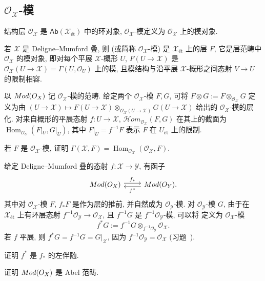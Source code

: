 \subsection{\texorpdfstring{$\mathcal O_{\mathcal X}$}{OX}-模}\label{src:5.1.2-subsection}
结构层 $\mathcal O_{\mathcal X}$ 是 $\mathsf{Ab}(\mathcal X_{\text{ét}})$ 中的环对象, $\mathcal O_{\mathcal X}$-模定义为 $\mathcal O_{\mathcal X}$ 上的模对象.
\begin{definition}\label{src:5.1.13}
若 $\mathcal X$ 是 Deligne--Mumford 叠, 则 (或简称 $\mathcal O_{\mathcal X}$-模) 是 $\mathcal X_{\text{ét}}$ 上的层 $F$, 它是层范畴中 $\mathcal O_{\mathcal X}$ 的模对象, 即对每个平展 $\mathcal X$-概形 $U$, $F(U\to\mathcal X)$ 是 $\mathcal O_{\mathcal X}(U\to\mathcal X)=\Gamma(U,\mathcal O_U)$ 上的模, 且模结构与沿平展 $\mathcal X$-概形之间态射 $V\to U$ 的限制相容.
\end{definition}
以 $Mod(O_{X})$ 记 $\mathcal O_{\mathcal X}$-模的范畴. 给定两个 $\mathcal O_{\mathcal X}$-模 $F,G$, 可将 $F\otimes G:=F\otimes_{\mathcal O_{\mathcal X}}G$ 定义为由 $(U\to\mathcal X)\mapsto F(U\to\mathcal X)\otimes_{\mathcal O_{\mathcal X}(U\to\mathcal X)}G(U\to\mathcal X)$ 给出的 $\mathcal O_{\mathcal X}$-模的层化. 对来自概形的平展态射 $f:U\to\mathcal X$,  $\mathcal H\!om_{\mathcal O_{\mathcal X}}(F,G)$ 在其上的截面为 $\operatorname{Hom}_{\mathcal O_U}(F|_U,G|_U)$, 其中 $F|_U=f^{-1}F$ 表示 $F$ 在 $U_{\text{ét}}$ 上的限制.
\begin{exercise}[简单]\label{src:5.1.14}
若 $F$ 是 $\mathcal O_{\mathcal X}$-模, 证明 $\Gamma(\mathcal X,F)=\operatorname{Hom}_{\mathcal O_{\mathcal X}}(\mathcal O_{\mathcal X},F)$.
\end{exercise}
给定 Deligne--Mumford 叠的态射 $f:\mathcal X\to\mathcal Y$, 有函子
\[
\begin{tikzcd}
\Mod(\mathcal O_{\mathcal X})\arrow[r,shift left,"f_*"]&\Mod(\mathcal O_{\mathcal Y})\arrow[l,shift left,"f^*"] .
\end{tikzcd}
\]
其中对 $\mathcal O_{\mathcal X}$-模 $F$, $f_*F$ 是作为层的推前, 并自然成为 $\mathcal O_{\mathcal Y}$-模. 对 $\mathcal O_{\mathcal Y}$-模 $G$, 由于在 $\mathcal X_{\text{ét}}$ 上有环层态射 $f^{-1}\mathcal O_{\mathcal Y}\to\mathcal O_{\mathcal X}$, 且 $f^{-1}G$ 是 $f^{-1}\mathcal O_{\mathcal Y}$-模, 可以将 定义为 $\mathcal O_{\mathcal X}$-模
\[
f^*G:=f^{-1}G\otimes_{f^{-1}\mathcal O_{\mathcal Y}}\mathcal O_{\mathcal X}.
\]
若 $f$ 平展, 则 $f^*G=f^{-1}G=G|_{\mathcal X}$, 因为 $f^{-1}\mathcal O_{\mathcal Y}=\mathcal O_{\mathcal X}$ (习题~).
\begin{exercise}[细节]\label{src:5.1.15}
证明 $f^*$ 是 $f_*$ 的左伴随.
\end{exercise}
\begin{exercise}[细节]\label{src:5.1.16}
证明 $Mod(O_{X})$ 是 Abel 范畴.
\end{exercise}

